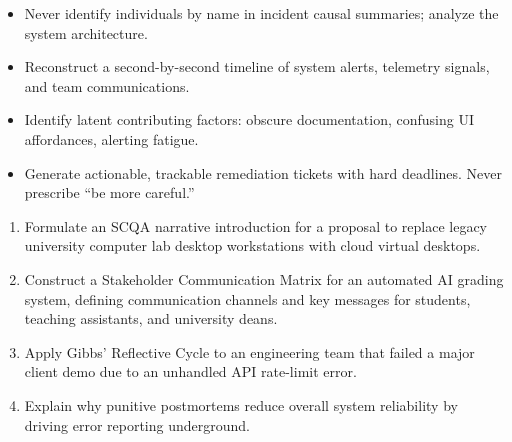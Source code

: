 \begin{important}
\begin{itemize}
    \item Never identify individuals by name in incident causal summaries; analyze the system architecture.
    \item Reconstruct a second-by-second timeline of system alerts, telemetry signals, and team communications.
    \item Identify latent contributing factors: obscure documentation, confusing UI affordances, alerting fatigue.
    \item Generate actionable, trackable remediation tickets with hard deadlines. Never prescribe ``be more careful.''
\end{itemize}
\end{important}

\begin{practiceset}
\begin{enumerate}[leftmargin=1.5em]
    \item Formulate an SCQA narrative introduction for a proposal to replace legacy university computer lab desktop workstations with cloud virtual desktops.
    \item Construct a Stakeholder Communication Matrix for an automated AI grading system, defining communication channels and key messages for students, teaching assistants, and university deans.
    \item Apply Gibbs' Reflective Cycle to an engineering team that failed a major client demo due to an unhandled API rate-limit error.
    \item Explain why punitive postmortems reduce overall system reliability by driving error reporting underground.
\end{enumerate}
\end{practiceset}

